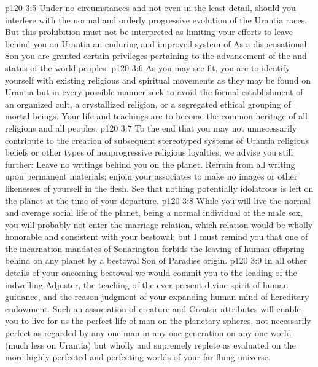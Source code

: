 \pc \vs p120 3:5 \bibnobreakspace Under no circumstances and not even in the least detail, should you interfere with the normal and orderly progressive evolution of the Urantia races. But this prohibition must not be interpreted as limiting your efforts to leave behind you on Urantia an enduring and improved system of  As a dispensational Son you are granted certain privileges pertaining to the advancement of the  and  status of the world peoples.
\pc \vs p120 3:6 \bibnobreakspace As you may see fit, you are to identify yourself with existing religious and spiritual movements as they may be found on Urantia but in every possible manner seek to avoid the formal establishment of an organized cult, a crystallized religion, or a segregated ethical grouping of mortal beings. Your life and teachings are to become the common heritage of all religions and all peoples.
\pc \vs p120 3:7 \bibnobreakspace To the end that you may not unnecessarily contribute to the creation of subsequent stereotyped systems of Urantia religious beliefs or other types of nonprogressive religious loyalties, we advise you still further: Leave no writings behind you on the planet. Refrain from all writing upon permanent materials; enjoin your associates to make no images or other likenesses of yourself in the flesh. See that nothing potentially idolatrous is left on the planet at the time of your departure.
\pc \vs p120 3:8 \bibnobreakspace While you will live the normal and average social life of the planet, being a normal individual of the male sex, you will probably not enter the marriage relation, which relation would be wholly honorable and consistent with your bestowal; but I must remind you that one of the incarnation mandates of Sonarington forbids the leaving of human offspring behind on any planet by a bestowal Son of Paradise origin.
\pc \vs p120 3:9 \bibnobreakspace In all other details of your oncoming bestowal we would commit you to the leading of the indwelling Adjuster, the teaching of the ever\hyp{}present divine spirit of human guidance, and the reason\hyp{}judgment of your expanding human mind of hereditary endowment. Such an association of creature and Creator attributes will enable you to live for us the perfect life of man on the planetary spheres, not necessarily perfect as regarded by any one man in any one generation on any one world (much less on Urantia) but wholly and supremely replete as evaluated on the more highly perfected and perfecting worlds of your far\hyp{}flung universe.
